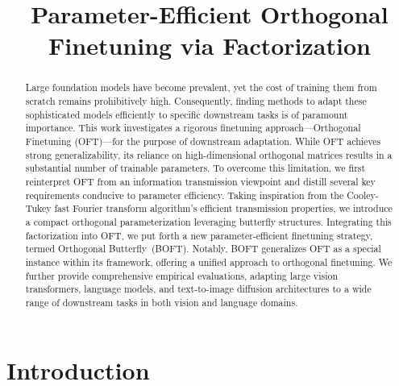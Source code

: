 \title{Parameter-Efficient Orthogonal Finetuning via Factorization}

\begin{abstract}
Large foundation models have become prevalent, yet the cost of training them from scratch remains prohibitively high. Consequently, finding methods to adapt these sophisticated models efficiently to specific downstream tasks is of paramount importance. This work investigates a rigorous finetuning approach—Orthogonal Finetuning (OFT)—for the purpose of downstream adaptation. While OFT achieves strong generalizability, its reliance on high-dimensional orthogonal matrices results in a substantial number of trainable parameters. To overcome this limitation, we first reinterpret OFT from an information transmission viewpoint and distill several key requirements conducive to parameter efficiency. Taking inspiration from the Cooley-Tukey fast Fourier transform algorithm’s efficient transmission properties, we introduce a compact orthogonal parameterization leveraging butterfly structures. Integrating this factorization into OFT, we put forth a new parameter-efficient finetuning strategy, termed Orthogonal Butterfly~(BOFT). Notably, BOFT generalizes OFT as a special instance within its framework, offering a unified approach to orthogonal finetuning. We further provide comprehensive empirical evaluations, adapting large vision transformers, language models, and text-to-image diffusion architectures to a wide range of downstream tasks in both vision and language domains.
\end{abstract}

\section{Introduction}

